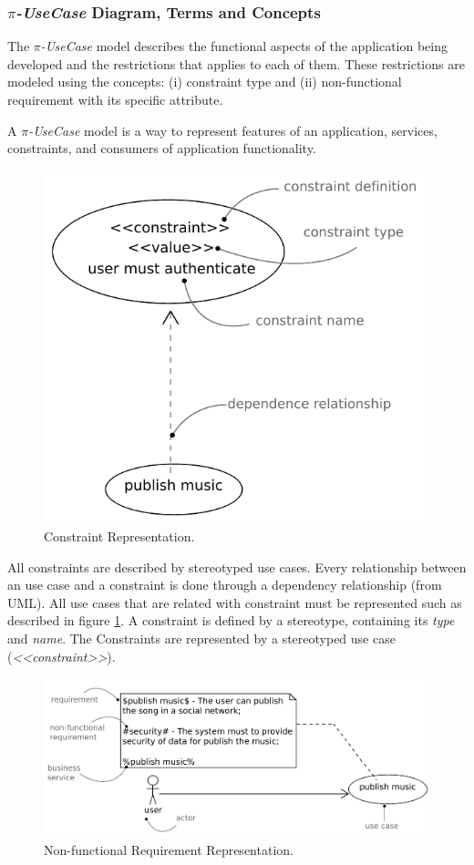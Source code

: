  \subsubsection{\textit{$\pi$-UseCase} Diagram, Terms and Concepts} 
  

The \textit{$\pi$-UseCase} model describes the
functional aspects of the application being developed and the restrictions
that applies to each of them. These restrictions are modeled using the concepts:
(i) constraint type and (ii) non-functional requirement with its
specific attribute.


 A \textit{$\pi$-UseCase} model is a way to represent features of an
 application, services, constraints, and consumers of application functionality.
 
%   

 \begin{figure}[ht!] 
\centering
\includegraphics[width=.4\textwidth]{chapters/methodology/figs/constraints_detail.pdf}
\caption{Constraint Representation.}
\label{fig:constraint_detail} 
\end{figure}

 All constraints are described by stereotyped use cases. Every relationship
 between an use case and a constraint is done through a dependency relationship
 (from UML). All use cases that are related with constraint must be
 represented such as described in figure \ref{fig:constraint_detail}. A
 constraint is defined by a stereotype, containing its \textit{type} and
 \textit{name}. The {\sc Constraints} are represented by a stereotyped use case
(\textit{<<constraint>>}).

 \begin{figure}[ht!] 
\centering
\includegraphics[width=.75\textwidth]{chapters/methodology/figs/nfr_detail.pdf}
\caption{Non-functional Requirement Representation.}
\label{fig:nfr_detail} 
\end{figure}

